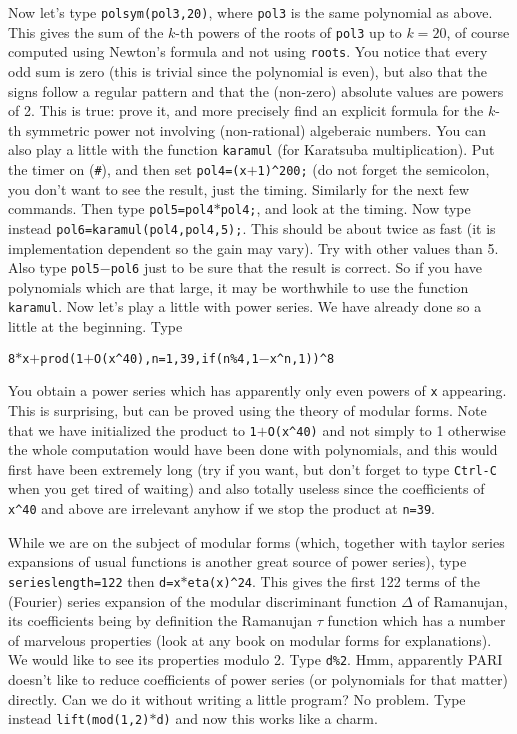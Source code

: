 Now let's type {\tt polsym(pol3,20)}, where {\tt pol3} is the same polynomial
as above. This gives the sum of the $k$-th powers of the roots of {\tt pol3}
up to $k=20$, of course computed using Newton's formula and not using
{\tt roots}. You notice that every odd sum is zero (this is trivial since the
polynomial is even), but also that the signs follow a regular pattern and
that the  (non-zero) absolute values are powers of 2. This is true: prove it,
and more precisely find an explicit formula for the $k$-th symmetric power
not involving (non-rational) algeberaic numbers.
\smallskip
You can also play a little with the function {\tt karamul} (for Karatsuba
multiplication). Put the timer on ({\tt \#}), and then set 
{\tt pol4=(x$+$1)\^{}200;} (do not forget the semicolon, you don't want to
see the result, just the timing. Similarly for the next few commands.
Then type {\tt pol5=pol4$*$pol4;}, and look at the timing. Now type instead
{\tt pol6=karamul(pol4,pol4,5);}. This should be about twice as fast (it is
implementation dependent so the gain may vary). Try with other values than 5.
Also type {\tt pol5$-$pol6} just to be sure that the result is correct.
So if you have polynomials which are that large, it may be worthwhile to use
the function {\tt karamul}.
\medskip
Now let's play a little with power series. We have already done so a little
at the beginning.  Type
\centerline{\tt 8$*$x$+$prod(1$+$O(x\^{}40),n=1,39,if(n\%4,1$-$x\^{}n,1))\^{}8}
You obtain a power series which has apparently only even powers of {\tt x}
appearing. This is surprising, but can be proved using the theory of modular
forms. Note that we have initialized the product to {\tt 1$+$O(x\^{}40)} and
not simply to 1 otherwise the whole computation would have been done with
polynomials, and this would first have been extremely long (try if you want,
but don't forget to type {\tt Ctrl-C} when you get tired of waiting) and also
totally useless since the coefficients of {\tt x\^{}40} and above are 
irrelevant anyhow if we stop the product at {\tt n=39}.

While we are on the subject of modular forms (which, together with taylor
series expansions of usual functions is another great source of power series),
type {\tt\bs serieslength=122} then {\tt d=x$*$eta(x)\^{}24}. This gives the
first 122 terms of the (Fourier) series expansion of the modular discriminant
function $\Delta$ of Ramanujan, its coefficients being by definition the
Ramanujan $\tau$ function which has a number of marvelous properties (look at
any book on modular forms for explanations). We would like to see its 
properties modulo 2. Type {\tt d\%2}. Hmm, apparently PARI doesn't like to
reduce coefficients of power series (or polynomials for that matter) directly.
Can we do it without writing a little program? No problem. Type instead
{\tt lift(mod(1,2)$*$d)} and now this works like a charm. 

